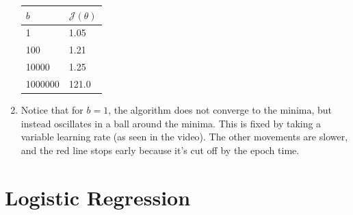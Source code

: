 \documentclass[12pt]{article}
\begin{document}
\begin{enumerate}[label=(\alph*)]
    \begin{center}
    \begin{tabular}{|l|l|}
        \hline
        $b$     & $\mathcal{J}(\theta)$ \\
        \hline
        1       & 1.05 \\
        100     & 1.21 \\
        10000   & 1.25 \\
        1000000 & 121.0 \\
        \hline
    \end{tabular}
    \end{center}

    \item \begin{center}\end{center}

    Notice that for $b=1$, the algorithm does not converge to the minima, but instead oscillates in a ball around the minima. This is fixed by taking a variable learning rate (as seen in the video). The other movements are slower, and the red line stops early because it's cut off by the epoch time.

\end{enumerate}

\pagebreak

\section*{Logistic Regression}
\end{document}

